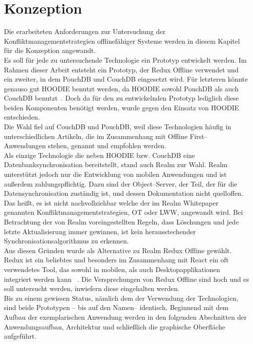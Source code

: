 \chapter{\label{chap:konzeption}Konzeption}
Die erarbeiteten Anforderungen zur Untersuchung der Konfliktmanagementstrategien offlinefähiger Systeme werden in diesem Kapitel für die Konzeption angewandt.\\
Es soll für jede zu untersuchende Technologie ein Prototyp entwickelt werden.
Im Rahmen dieser Arbeit entsteht ein Prototyp, der Redux Offline verwendet und ein zweiter, in dem PouchDB und CouchDB eingesetzt wird.
Für letzteren könnte genauso gut HOODIE benutzt werden, da HOODIE sowohl PouchDB als auch CouchDB benutzt~\cite{hoodie-how}.
Doch da für den zu entwickelnden Prototyp lediglich diese beiden Komponenten benötigt werden, wurde gegen den Einsatz von HOODIE entschieden.\\
%
Die Wahl fiel auf CouchDB und PouchDB, weil diese Technologien häufig in unterschiedlichen Artikeln, die im Zusammenhang mit Offline First--Anwendungen stehen, genannt und empfohlen werden.\\
% 
Als einzige Technologie die neben HOODIE bzw. CouchDB eine Datenbanksynchronisation bereitstellt, stand auch Realm zur Wahl.
Realm unterstützt jedoch nur die Entwicklung von mobilen Anwendungen und ist außerdem zahlungspflichtig.
Dazu sind der Object--Server, der Teil, der für die Datensynchronisation zuständig ist, und dessen Dokumentation nicht quelloffen.
Das heißt, es ist nicht nachvollziehbar welche der im Realm Whitepaper genannten Konfliktmanagementstrategien, \gls{OT} oder \gls{LWW}, angewandt wird.
Bei Betrachtung der von Realm voreingestellten Regeln, dass Löschungen und jede letzte Aktualisierung immer gewinnen, ist kein herausstechender Synchronisationsalgorithmus zu erkennen.\\
% 
Aus diesen Gründen wurde als Alternative zu Realm Redux Offline gewählt. Redux ist ein beliebtes und besonders im Zusammenhang mit React ein oft verwendetes Tool, das sowohl in mobilen, als auch Desktopapplikationen integriert werden kann ~\cite{statereact}.
Die Versprechungen von Redux Offline sind hoch und es soll untersucht werden, inwiefern diese eingehalten werden.\\
% 
% 
% 
Bis zu einem gewissen Status, nämlich dem der Verwendung der Technologien, sind beide Prototypen -- bis auf den Namen-- identisch.
Beginnend mit dem Aufbau der exemplarischen Anwendung werden in den folgenden Abschnitten der Anwendungsaufbau, Architektur und schließlich die graphische Oberfläche aufgeführt.
%
%
